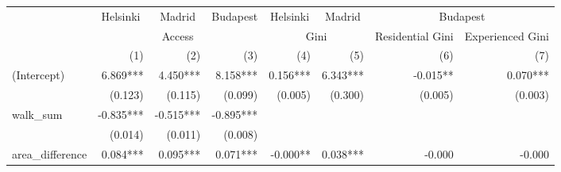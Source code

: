\begin{tabular}{lrrrrrrr}
\toprule
                      & \multicolumn{1}{c}{Helsinki} & \multicolumn{1}{c}{Madrid} & \multicolumn{1}{c}{Budapest} & \multicolumn{1}{c}{Helsinki} & \multicolumn{1}{c}{Madrid} &                         \multicolumn{2}{c}{Budapest}                        \\ 
\cmidrule(lr){2-2} \cmidrule(lr){3-3} \cmidrule(lr){4-4} \cmidrule(lr){5-5} \cmidrule(lr){6-6} \cmidrule(lr){7-8} 
                      &                                \multicolumn{3}{c}{Access}                                &                  \multicolumn{2}{c}{Gini}                 & \multicolumn{1}{c}{Residential Gini} & \multicolumn{1}{c}{Experienced Gini} \\ 
\cmidrule(lr){2-4} \cmidrule(lr){5-6} \cmidrule(lr){7-7} \cmidrule(lr){8-8} 
                      &                          (1) &                        (2) &                          (3) &                          (4) &                        (5) &                                  (6) &                                  (7) \\ 
\midrule
(Intercept)           &                     6.869*** &                   4.450*** &                     8.158*** &                     0.156*** &                   6.343*** &                             -0.015** &                             0.070*** \\ 
                      &                      (0.123) &                    (0.115) &                      (0.099) &                      (0.005) &                    (0.300) &                              (0.005) &                              (0.003) \\ 
walk\_sum             &                    -0.835*** &                  -0.515*** &                    -0.895*** &                              &                            &                                      &                                      \\ 
                      &                      (0.014) &                    (0.011) &                      (0.008) &                              &                            &                                      &                                      \\ 
area\_difference      &                     0.084*** &                   0.095*** &                     0.071*** &                     -0.000** &                   0.038*** &                               -0.000 &                               -0.000 \\ 

\end{tabular}
